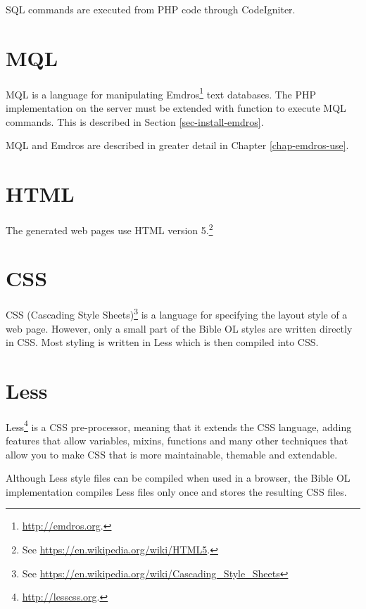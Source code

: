 \documentclass[11pt,oneside,a4paper]{memoir}
\begin{document}
SQL commands are executed from PHP code through CodeIgniter.


\section{MQL}\label{sec-mql}

MQL is a language for manipulating Emdros\footnote{\url{http://emdros.org}.} text
databases. The PHP implementation on the server must be extended with function to execute MQL
commands. This is described in Section \ref{sec-install-emdros}.

MQL and Emdros are described in greater detail in Chapter \ref{chap-emdros-use}.



\section{HTML}

The generated web pages use HTML version 5.\footnote{See \url{https://en.wikipedia.org/wiki/HTML5}.}


\section{CSS}\label{sec-css}

CSS (Cascading Style Sheets)\footnote{See
  \url{https://en.wikipedia.org/wiki/Cascading_Style_Sheets}} is a language for specifying the
layout style of a web page. However, only a small part of the Bible OL styles are written directly
in CSS. Most styling is written in Less which is then compiled into CSS.


\section{Less}\label{sec-less}

Less\footnote{\url{http://lesscss.org}.} is a CSS pre-processor, meaning that it
extends the CSS language, adding features that allow variables, mixins, functions and many other
techniques that allow you to make CSS that is more maintainable, themable and extendable.

Although Less style files can be compiled when used in a browser, the Bible OL implementation
compiles Less files only once and stores the resulting CSS files.
\end{document}
